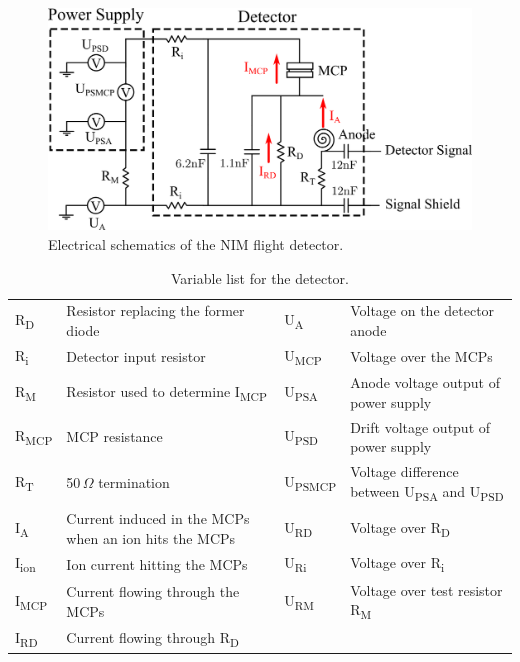		\begin{figure}[h]
			\centering
			\includegraphics[width = .8\textwidth]{Bilder/Detector_elec_schema.png}
			\caption{Electrical schematics of the NIM flight detector.}
			\label{fig:FlighElecSchema}
		\end{figure}
		
		
		\begin{table}[h]
			\begin{center}
			\begin{tabular}{|m{1.5cm}|m{5.4cm}|m{1.5cm}|m{5.4cm}|}
				\hline
				R\textsubscript{D}& Resistor replacing the former diode & U\textsubscript{A}& Voltage on the detector anode \\
				R\textsubscript{i} & Detector input resistor & U\textsubscript{MCP}& Voltage over the MCPs \\
				R\textsubscript{M}& Resistor used to determine I\textsubscript{MCP} &U\textsubscript{PSA} & Anode voltage output of power supply \\
				R\textsubscript{MCP}& MCP resistance & U\textsubscript{PSD} & Drift voltage output of power supply \\
				R\textsubscript{T} & 50\,$\Omega$ termination & U\textsubscript{PSMCP} & Voltage difference  between U\textsubscript{PSA} and U\textsubscript{PSD} \\
				I\textsubscript{A} & Current induced in the MCPs when an ion hits the MCPs & U\textsubscript{RD}& Voltage over R\textsubscript{D} \\
				I\textsubscript{ion} & Ion current hitting the MCPs & U\textsubscript{Ri}& Voltage over R\textsubscript{i} \\
				I\textsubscript{MCP} & Current flowing through the MCPs &U\textsubscript{RM}& Voltage over test resistor R\textsubscript{M}\\
				I\textsubscript{RD} & Current flowing through R\textsubscript{D} &&\\
				\hline
			\end{tabular}
			\end{center}
			\caption{Variable list for the detector.}
			\label{tab:ElecSchemaVariableList}
		\end{table}
	

